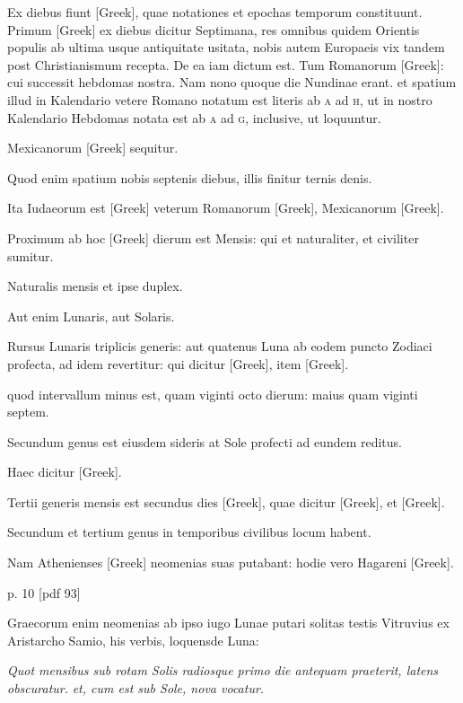 Ex diebus fiunt \textgreek{[Greek]}, quae notationes et epochas
temporum constituunt.
Primum \textgreek{[Greek]} ex diebus dicitur Septimana,
res omnibus quidem Orientis populis ab ultima usque
antiquitate usitata,
 nobis autem Europaeis vix tandem post Christianismum
recepta.
De ea iam dictum est.
Tum Romanorum \textgreek{[Greek]}: cui
successit hebdomas nostra.
Nam nono quoque die Nundinae erant.
et spatium illud in Kalendario vetere Romano notatum est literis ab
\textsc{a} ad \textsc{h}, ut in nostro Kalendario Hebdomas
 notata est ab \textsc{a} ad \textsc{g}, inclusive,
ut loquuntur.

Mexicanorum \textgreek{[Greek]} sequitur.

Quod
enim spatium nobis septenis diebus, illis finitur ternis denis.

Ita Iudaeorum
est \textgreek{[Greek]} veterum Romanorum \textgreek{[Greek]}, Mexicanorum
\textgreek{[Greek]}.

Proximum ab hoc \textgreek{[Greek]} dierum est Mensis:
qui et naturaliter, et civiliter sumitur.

Naturalis mensis et ipse duplex.

Aut enim Lunaris, aut Solaris.

Rursus Lunaris triplicis generis:
aut quatenus Luna ab eodem puncto Zodiaci profecta, ad idem
revertitur: qui dicitur \textgreek{[Greek]}, item \textgreek{[Greek]}.

quod intervallum
minus est, quam viginti octo dierum: maius quam viginti septem.

Secundum genus est eiusdem sideris at Sole profecti ad eundem
reditus.

Haec dicitur \textgreek{[Greek]}.

Tertii generis mensis est secundus
dies \textgreek{[Greek]}, quae dicitur \textgreek{[Greek]},
 et \textgreek{[Greek]}.

Secundum et tertium genus in temporibus civilibus locum habent.

Nam Athenienses \textgreek{[Greek]} neomenias suas putabant: hodie vero
Hagareni \textgreek{[Greek]}.


p. 10 [pdf 93]

Graecorum enim neomenias ab ipso iugo
Lunae putari solitas testis Vitruvius ex Aristarcho Samio, his verbis,
loquensde Luna:

\textit{Quot mensibus sub rotam Solis radiosque primo die
antequam praeterit, latens obscuratur.}
 \textit{et, cum est sub Sole, nova vocatur.}

